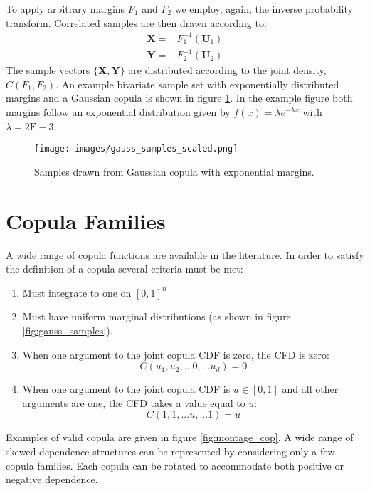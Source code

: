 To apply arbitrary margins $F_1$ and $F_2$ we employ, again, the inverse probability transform. 
Correlated samples are then drawn according to:
\begin{eqnarray}
\mathbf X = & F_1^{-1}(\mathbf U_1) \\
\mathbf Y = & F_2^{-1}(\mathbf U_2)
\end{eqnarray}
The sample vectors $\{\mathbf X, \mathbf Y\}$ are distributed according to the joint density, $C(F_1, F_2)$.  An example bivariate sample set with exponentially distributed margins and a Gaussian copula is shown in figure \ref{fig:gauss_samples_scaled}.  In the example figure both margins follow an exponential distribution given by $f(x)=\lambda e^{-\lambda x}$ with $\lambda=2\mathrm{E-}3$.

\begin{figure}[!htbp]
	\centering
	\texttt{[image: images/gauss\_samples\_scaled.png]}
	\caption{Samples drawn from Gaussian copula with exponential margins.}
	\label{fig:gauss_samples_scaled}
\end{figure}


\section*{Copula Families}

A wide range of copula functions are available in the literature.  In order to satisfy the definition of a copula several criteria must be met:
\begin{enumerate}
	\item Must integrate to one on $[0, 1]^n$
	\item Must have uniform marginal distributions (as shown in figure \ref{fig:gauss_samples}).
	\item When one argument to the joint copula CDF is zero, the CFD is zero:
	\begin{equation}
	C(u_1, u_2, ... 0, ... u_d) = 0
	\end{equation}
	\item When one argument to the joint copula CDF is $u\in[0,1]$ and all other arguments are one, the CFD takes a value equal to $u$:
	\begin{equation}
	C(1, 1, ... u, ... 1) = u
	\end{equation}
\end{enumerate}

Examples of valid copula are given in figure \ref{fig:montage_cop}.  A wide range of skewed dependence structures can be represented by considering only a few copula families.  Each copula can be rotated to accommodate both positive or negative dependence.

